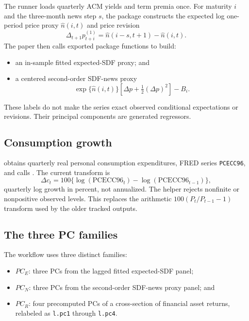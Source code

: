 \documentclass[11pt]{article}
\begin{document}
The runner loads quarterly ACM yields and term premia once. For maturity $i$
and the three-month news step $s$, the package constructs the expected log
one-period price proxy $\hat n(i,t)$ and price revision
\[
  \Delta_{t+1}p_{t+i}^{(1)}
  = \hat n(i-s,t+1)-\hat n(i,t).
\]
The paper then calls exported package functions to build:

\begin{itemize}[leftmargin=1.5em]
  \item an in-sample fitted expected-SDF proxy; and
  \item a centered second-order SDF-news proxy
    \[
    \exp\{\hat n(i,t)\}
      \left[\Delta p+\tfrac12(\Delta p)^2\right]-B_i.
    \]
\end{itemize}

These labels do not make the series exact observed conditional expectations
or revisions. Their principal components are generated regressors.

\subsection{Consumption growth}

 obtains quarterly real
personal consumption expenditures, FRED series \texttt{PCECC96}, and calls
. The current transform is
\[
  \Delta c_t
  =100\{\log(\text{PCECC96}_t)-\log(\text{PCECC96}_{t-1})\},
\]
quarterly log growth in percent, not annualized. The helper rejects
nonfinite or nonpositive observed levels. This replaces the arithmetic
$100(P_t/P_{t-1}-1)$ transform used by the older tracked outputs.

\subsection{The three PC families}

The workflow uses three distinct families:

\begin{itemize}[leftmargin=1.5em]
  \item $PC_E$: three PCs from the lagged fitted expected-SDF panel;
  \item $PC_N$: three PCs from the second-order SDF-news proxy panel; and
  \item $PC_R$: four precomputed PCs of a cross-section of financial asset
    returns, relabeled as \texttt{l.pc1} through \texttt{l.pc4}.
\end{itemize}
\end{document}
